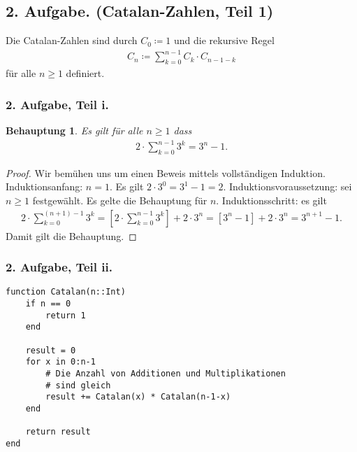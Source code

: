 \documentclass[draft,a5paper]{article}
\newtheorem*{beh}{Behauptung}
\begin{document}
\subsection*{2. Aufgabe. (Catalan-Zahlen, Teil 1)}

Die Catalan-Zahlen sind durch \(C_{0} \coloneq 1\) und die rekursive Regel
\begin{align*}
  C_{n} \coloneq \sum_{k=0}^{n-1}{C_{k} \cdot C_{n-1-k}}
\end{align*}
für alle \(n \ge 1\) definiert.

\subsubsection*{2. Aufgabe, Teil i.}

\begin{beh}
  Es gilt für alle \(n \ge 1\) dass
  \begin{align*}
    2 \cdot \sum_{k=0}^{n-1}{3^{k}} = 3^{n} - 1.
  \end{align*}
\end{beh}

\begin{proof}
  Wir bemühen uns um einen Beweis mittels vollständigen Induktion.
  Induktionsanfang: \(n = 1\).  Es gilt \(2 \cdot 3^{0} = 3^{1} - 1 = 2
  \).  Induktionsvoraussetzung: sei \(n \ge 1\) festgewählt.  Es gelte die
  Behauptung für \(n\).  Induktionsschritt: es gilt
  \begin{align*}
    2 \cdot \sum_{k=0}^{(n+1)-1}{3^{k}}
    = \left[2 \cdot \sum_{k=0}^{n-1}{3^{k}}\right] + 2 \cdot 3^{n}
    = \left[3^{n} - 1\right] + 2 \cdot 3^{n}
    = 3^{n+1} -1.
  \end{align*}
  Damit gilt die Behauptung.
\end{proof}

\newpage

\subsubsection*{2. Aufgabe, Teil ii.}

\begin{verbatim}
function Catalan(n::Int)
    if n == 0
        return 1
    end

    result = 0
    for x in 0:n-1
        # Die Anzahl von Additionen und Multiplikationen
        # sind gleich
        result += Catalan(x) * Catalan(n-1-x)
    end

    return result
end
\end{verbatim}
\end{document}
